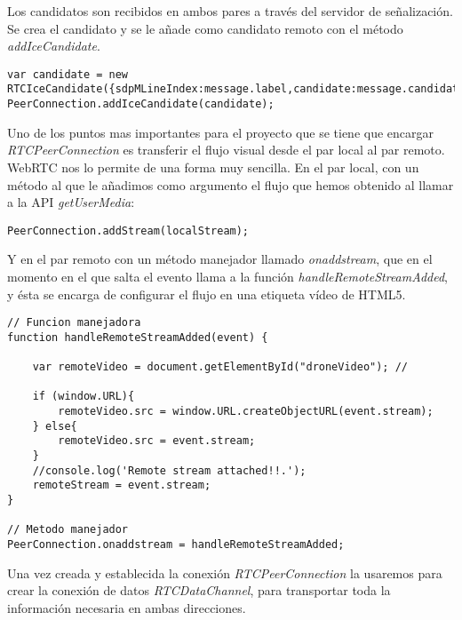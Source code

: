 Los candidatos son recibidos en ambos pares a través del servidor de señalización. Se crea el candidato y se le añade como candidato remoto con el método \emph{addIceCandidate}.\\

\begin{lstlisting}[caption=Manejador de los Candidatos ICE remotos.]
var candidate = new RTCIceCandidate({sdpMLineIndex:message.label,candidate:message.candidate});
PeerConnection.addIceCandidate(candidate);
\end{lstlisting}


Uno de los puntos mas importantes para el proyecto que se tiene que encargar \emph{RTCPeerConnection} es transferir el flujo visual desde el par local al par remoto. WebRTC nos lo permite de una forma muy sencilla. En el par local, con un método al que le añadimos como argumento el flujo que hemos obtenido al llamar a la API \emph{getUserMedia}:\\

\begin{lstlisting}[caption=Manejador del flujo audiovisual en el par local.]
PeerConnection.addStream(localStream); 
\end{lstlisting}

Y en el par remoto con un método manejador llamado \emph{onaddstream}, que en el momento en el que salta el evento llama a la función \emph{handleRemoteStreamAdded}, y ésta se encarga de configurar el flujo en una etiqueta vídeo de HTML5.\\

\begin{lstlisting}[caption=Manejador del flujo audiovisual en el par remoto.]
// Funcion manejadora
function handleRemoteStreamAdded(event) {

    var remoteVideo = document.getElementById("droneVideo"); // 

	if (window.URL){
		remoteVideo.src = window.URL.createObjectURL(event.stream);
	} else{
		remoteVideo.src = event.stream;
	}
    //console.log('Remote stream attached!!.');
	remoteStream = event.stream;
}

// Metodo manejador 
PeerConnection.onaddstream = handleRemoteStreamAdded;
\end{lstlisting}

Una vez creada y establecida la conexión \emph{RTCPeerConnection} la usaremos para crear la conexión de datos \emph{RTCDataChannel}, para transportar toda la información necesaria en ambas direcciones.\\


